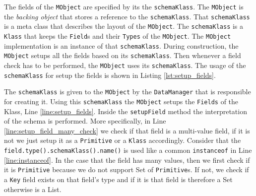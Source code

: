 The fields of the \texttt{MObject} are specified by its the \texttt{schemaKlass}.
The \texttt{MObject} is the \textit{backing object} that stores a reference to the \texttt{schemaKlass}.
That \texttt{schemaKlass} is a meta class that describes the layout of the \texttt{MObject}. 
The \texttt{schemaKlass} is a \texttt{Klass} that keeps the \texttt{Field}s and their \texttt{Types} of the \texttt{MObject}.
The \texttt{MObject} implementation is an instance of that \texttt{schemaKlass}.
During construction, the \texttt{MObject} setups all the fields based on its \texttt{schemaKlass}.
Then whenever a field check has to be performed, the \texttt{MObject} uses its \texttt{schemaKlass}.
The usage of the \texttt{schemaKlass} for setup the fields is shown in Listing \ref{lst:setup_fields}.

The \texttt{schemaKlass} is given to the \texttt{MObject} by the \texttt{DataManager} that  is responsible for creating it.
Using this \texttt{schemaKlass} the \texttt{MObject} setups the \texttt{Fields} of the Klass, Line \ref{line:setup_fields}.
Inside the \texttt{setupField} method the interpretation of the schema is performed.
More specifically, in Line \ref{line:setup_field_many_check} we check if that field is a multi-value field, if it is not we just setup it as a \texttt{Primitive} or a \texttt{Klass} accordingly. 
Consider that the \texttt{field.type().schemaKlass().name()} is used like a common \texttt{instanceof} in Line \ref{line:instanceof}.
In the case that the field has many values, then we first check if it is \texttt{Primitive} because we do not support Set of \texttt{Primitive}s.
If not, we check if a \texttt{Key} field exists on that field's type and if it is that field is therefore a Set otherwise is a List.

